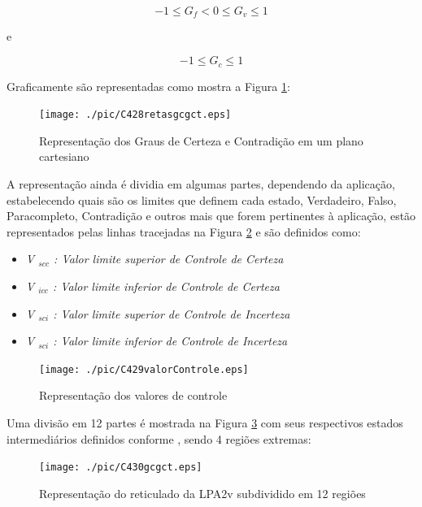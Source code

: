 \begin{center}
\begin{equation}
-1 \le G _{f}  <  0 \le G _{v} \le 1
\label{eq:grauVerdadeFalsidade}
\end{equation}
\end{center}
e
\begin{center}
\begin{equation}
-1 \le G _{c} \le 1
\label{eq:grauCertezaIntervalo}
\end{equation}
\end{center}


Graficamente são representadas como mostra a Figura \ref{fig:retasgcgct}:

\begin{figure}[!htb]
\center\texttt{[image: ./pic/C428retasgcgct.eps]}
\caption{Representação dos Graus de Certeza e Contradição em um plano cartesiano}
\label{fig:retasgcgct}
\end{figure}

A representação ainda é dividia em algumas partes, dependendo da aplicação, estabelecendo quais são os limites que definem cada estado, Verdadeiro, Falso, Paracompleto, Contradição e outros mais que forem pertinentes à aplicação, estão representados pelas linhas tracejadas na Figura \ref{fig:valorControle} e são definidos como:

\begin{itemize}
\item \emph{V $_{scc}$ : Valor limite superior de Controle de Certeza}
\item \emph{V $_{icc}$ : Valor limite inferior de Controle de Certeza}
\item \emph{V $_{sci}$ : Valor limite superior de Controle de Incerteza}
\item \emph{V $_{sci}$ : Valor limite inferior de Controle de Incerteza}

\end{itemize}

\begin{figure}[!htb]
\center\texttt{[image: ./pic/C429valorControle.eps]}
\caption{Representação dos valores de controle}
\label{fig:valorControle}
\end{figure}

Uma divisão em 12 partes é mostrada na Figura \ref{fig:reticuladoLPA2v} com seus respectivos estados intermediários definidos conforme \cite{JoaoInacio}, sendo 4 regiões extremas:


\begin{figure}[!htb]
\center\texttt{[image: ./pic/C430gcgct.eps]}
\caption{Representação do reticulado da LPA2v subdividido em 12 regiões}
\label{fig:reticuladoLPA2v}
\end{figure}


